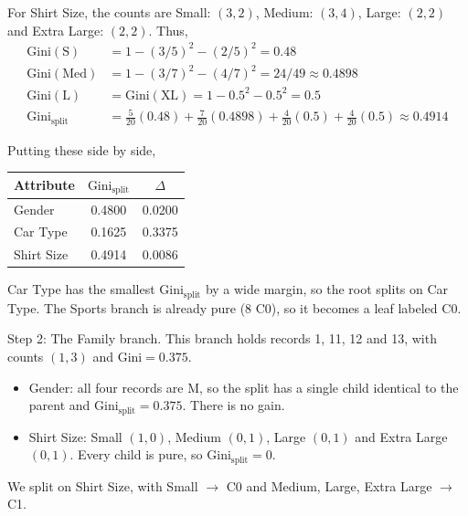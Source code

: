 \documentclass[12pt,letterpaper, onecolumn]{exam}
\begin{document}
\begin{questions}
\begin{solution}
        For Shirt Size, the counts are Small: $(3,2)$, Medium: $(3,4)$, Large: $(2,2)$ and Extra Large: $(2,2)$. Thus,
        \begin{align*}
            \text{Gini}(\text{S}) &= 1-(3/5)^2-(2/5)^2 = 0.48\\
            \text{Gini}(\text{Med}) &= 1-(3/7)^2-(4/7)^2 = 24/49 \approx 0.4898\\
            \text{Gini}(\text{L}) &= \text{Gini}(\text{XL}) = 1-0.5^2-0.5^2 = 0.5\\
            \text{Gini}_{\text{split}} &= \tfrac{5}{20}(0.48)+\tfrac{7}{20}(0.4898)+\tfrac{4}{20}(0.5)+\tfrac{4}{20}(0.5) \approx 0.4914
        \end{align*}

        Putting these side by side,
        \begin{center}
            \begin{tabular}{|l|c|c|}
                \hline Attribute & $\text{Gini}_{\text{split}}$ & $\Delta$ \\ \hline
                Gender & 0.4800 & 0.0200 \\
                Car Type & 0.1625 & 0.3375 \\
                Shirt Size & 0.4914 & 0.0086 \\ \hline
            \end{tabular}
        \end{center}
        Car Type has the smallest $\text{Gini}_{\text{split}}$ by a wide margin, so the root splits on Car Type. The Sports branch is already pure (8 C0), so it becomes a leaf labeled C0.

        Step 2: The Family branch. This branch holds records 1, 11, 12 and 13, with counts $(1,3)$ and $\text{Gini}=0.375$.
        \begin{itemize}
            \item Gender: all four records are M, so the split has a single child identical to the parent and $\text{Gini}_{\text{split}}=0.375$. There is no gain.
            \item Shirt Size: Small $(1,0)$, Medium $(0,1)$, Large $(0,1)$ and Extra Large $(0,1)$. Every child is pure, so $\text{Gini}_{\text{split}}=0$.
        \end{itemize}
        We split on Shirt Size, with Small $\to$ C0 and Medium, Large, Extra Large $\to$ C1.


\end{solution}
\end{questions}
\end{document}
